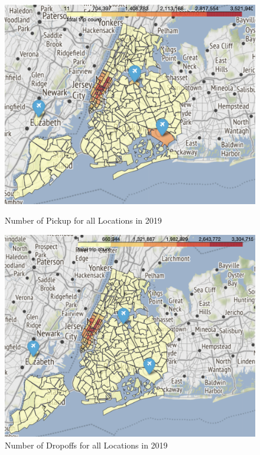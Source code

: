 \documentclass[11pt]{article}
\begin{document}
\begin{figure}[h]
    \centering
    \begin{minipage}{0.45\textwidth}
        \centering
        \includegraphics[width=1.2\textwidth]{plots/Screen Shot 2022-08-23 at 3.09.58 pm.png}
        \caption{Number of Pickup for all Locations in 2019}
        \label{fig:pickup}
    \end{minipage}\hfill
    \begin{minipage}{0.45\textwidth}
        \centering
        \includegraphics[width=1.2\textwidth]{plots/Screen Shot 2022-08-23 at 3.10.19 pm.png}
        \caption{Number of Dropoffs for all Locations in 2019}
        \label{fig:dropoff}
    \end{minipage}
\end{figure}
\end{document}
